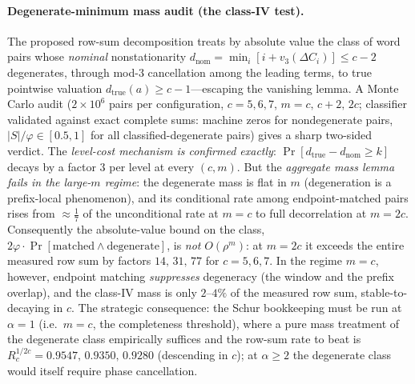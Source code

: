 \documentclass[11pt]{article}
\theoremstyle{plain}
\theoremstyle{definition}
\theoremstyle{remark}
\begin{document}
\paragraph{Degenerate-minimum mass audit (the class-IV test).} The proposed
row-sum decomposition treats by absolute value the class of word pairs whose
\emph{nominal} nonstationarity $d_{\mathrm{nom}}=\min_i[i+v_3(\Delta C_i)]\le
c-2$ degenerates, through mod-$3$ cancellation among the leading terms, to
true pointwise valuation $d_{\mathrm{true}}(a)\ge c-1$---escaping the
vanishing lemma. A Monte Carlo audit ($2\times10^6$ pairs per configuration,
$c=5,6,7$, $m=c,\,c+2,\,2c$; classifier validated against exact complete
sums: machine zeros for nondegenerate pairs, $|S|/\varphi\in[0.5,1]$ for all
classified-degenerate pairs) gives a sharp two-sided verdict. The
\emph{level-cost mechanism is confirmed exactly}: $\Pr[d_{\mathrm{true}}-
d_{\mathrm{nom}}\ge k]$ decays by a factor $3$ per level at every $(c,m)$.
But the \emph{aggregate mass lemma fails in the large-$m$ regime}: the
degenerate mass is flat in $m$ (degeneration is a prefix-local phenomenon),
and its conditional rate among endpoint-matched pairs rises from
$\approx\frac17$ of the unconditional rate at $m=c$ to full decorrelation at
$m=2c$. Consequently the absolute-value bound on the class,
$2\varphi\cdot\Pr[\text{matched}\wedge\text{degenerate}]$, is \emph{not}
$O(\rho^m)$: at $m=2c$ it exceeds the entire measured row sum by factors
$14,\,31,\,77$ for $c=5,6,7$. In the regime $m=c$, however, endpoint matching
\emph{suppresses} degeneracy (the window and the prefix overlap), and the
class-IV mass is only $2$--$4\%$ of the measured row sum, stable-to-decaying
in $c$. The strategic consequence: the Schur bookkeeping must be run at
$\alpha=1$ (i.e.\ $m=c$, the completeness threshold), where a pure mass
treatment of the degenerate class empirically suffices and the row-sum rate
to beat is $R_c^{1/2c}=0.9547,\,0.9350,\,0.9280$ (descending in $c$); at
$\alpha\ge2$ the degenerate class would itself require phase cancellation.
\end{document}
